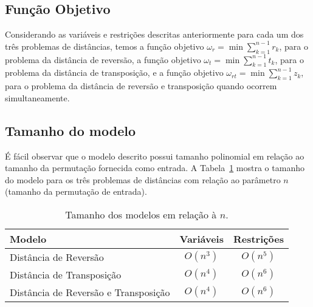 \subsection{Função Objetivo}
\label{subsec:fo}
Considerando as variáveis e restrições descritas anteriormente para cada
um dos três problemas de distâncias, temos a função objetivo $\omega_{r}
= \min \sum_{k=1}^{n-1} r_{k}$, para o problema da distância de
reversão, a função objetivo $\omega_{t} = \min \sum_{k=1}^{n-1} t_{k}$,
para o problema da distância de transposição, e a função objetivo
$\omega_{rt} = \min \sum_{k=1}^{n-1} z_{k}$, para o problema da
distância de reversão e transposição quando ocorrem simultaneamente.

\subsection{Tamanho do modelo}
\label{subsec:modelsize}
É fácil observar que o modelo descrito possui tamanho polinomial em
relação ao tamanho da permutação fornecida como entrada. A
Tabela~\ref{table:modelsize} mostra o tamanho do modelo para os três
problemas de distâncias com relação ao parâmetro $n$ (tamanho da
permutação de entrada).

\begin{table}[h]
\caption{Tamanho dos modelos em relação à $n$.}
\label{table:modelsize}
\center
\begin{tabular}{|l|c|c|}
  \hline
  \textbf{Modelo} & \textbf{Variáveis} & \textbf{Restrições} \\
  \hline
  Distância de Reversão & $O(n^3)$ & $O(n^5)$ \\
  Distância de Transposição & $O(n^4)$ & $O(n^6)$ \\
  Distância de Reversão e Transposição & $O(n^4)$ & $O(n^6)$ \\
  \hline
\end{tabular}
\end{table}
